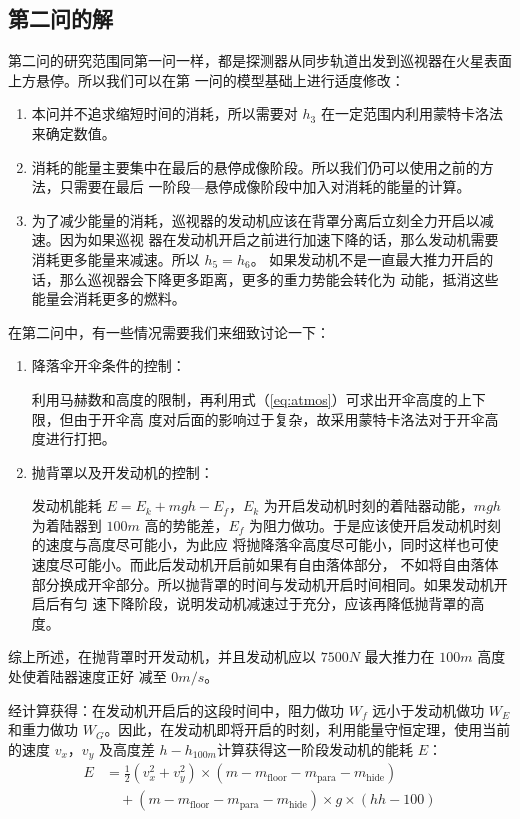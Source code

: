 \documentclass[hyperref,a4paper,UTF8]{ctexart}
\begin{document}
\subsection{第二问的解}
第二问的研究范围同第一问一样，都是探测器从同步轨道出发到巡视器在火星表面上方悬停。所以我们可以在第
一问的模型基础上进行适度修改：
\begin{enumerate}
    \item 本问并不追求缩短时间的消耗，所以需要对 $h_3$ 在一定范围内利用蒙特卡洛法来确定数值。
    \item 消耗的能量主要集中在最后的悬停成像阶段。所以我们仍可以使用之前的方法，只需要在最后
          一阶段---悬停成像阶段中加入对消耗的能量的计算。
    \item 为了减少能量的消耗，巡视器的发动机应该在背罩分离后立刻全力开启以减速。因为如果巡视
          器在发动机开启之前进行加速下降的话，那么发动机需要消耗更多能量来减速。所以 $h_5 = h_6$。
          如果发动机不是一直最大推力开启的话，那么巡视器会下降更多距离，更多的重力势能会转化为
          动能，抵消这些能量会消耗更多的燃料。
\end{enumerate}

在第二问中，有一些情况需要我们来细致讨论一下：
\begin{enumerate}
    \item 降落伞开伞条件的控制：\par
    利用马赫数和高度的限制，再利用式（\ref{eq:atmos}）可求出开伞高度的上下限，但由于开伞高
    度对后面的影响过于复杂，故采用蒙特卡洛法对于开伞高度进行打把。
    \item 抛背罩以及开发动机的控制：\par
    发动机能耗 $E = E_k + mgh - E_f$，$E_k$ 为开启发动机时刻的着陆器动能，$mgh$ 为着陆器到
    $100m$ 高的势能差，$E_f$ 为阻力做功。于是应该使开启发动机时刻的速度与高度尽可能小，为此应
    将抛降落伞高度尽可能小，同时这样也可使速度尽可能小。而此后发动机开启前如果有自由落体部分，
    不如将自由落体部分换成开伞部分。所以抛背罩的时间与发动机开启时间相同。如果发动机开启后有匀
    速下降阶段，说明发动机减速过于充分，应该再降低抛背罩的高度。
\end{enumerate}

综上所述，在抛背罩时开发动机，并且发动机应以 $7500N$ 最大推力在 $100m$ 高度处使着陆器速度正好
减至 $0m/s$。

经计算获得：在发动机开启后的这段时间中，阻力做功 $W_f$ 远小于发动机做功 $W_E$ 和重力做功
$W_G$。因此，在发动机即将开启的时刻，利用能量守恒定理，使用当前的速度 $v_x$，$v_y$ 及高度差
$h-h_{100m}$ ​计算获得这一阶段发动机的能耗 $E$：
\begin{equation*}
    \begin{split}
        E &= \frac{1}{2}(v_x^2+v_y^2)\times (m-m_{\text{floor}}-m_{\text{para}}-m_{\text{hide}}) \\
        &\quad + (m-m_{\text{floor}}-m_{\text{para}}-m_{\text{hide}})\times g\times (hh-100)
    \end{split}
\end{equation*}
\end{document}
